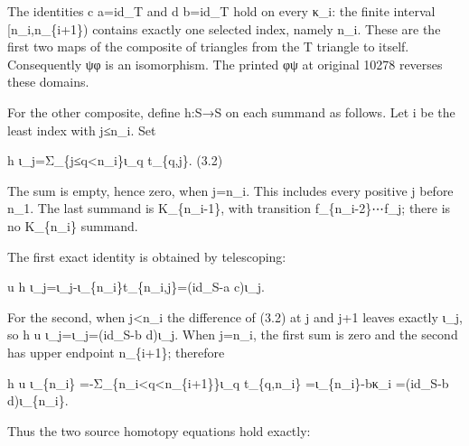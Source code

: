 \documentclass[11pt]{article}
\begin{document}
The identities c a\allowbreak{}=id\_\allowbreak{}T and d b\allowbreak{}=id\_\allowbreak{}T hold on every κ\_\allowbreak{}i:\allowbreak{} the finite interval [n\_\allowbreak{}i,\allowbreak{}n\_\allowbreak{}\{i\allowbreak{}+1\})\allowbreak{} contains exactly one selected index,\allowbreak{} namely n\_\allowbreak{}i. These are the first two maps of the composite of triangles from the T triangle to itself. Consequently ψφ is an isomorphism. The printed φψ at original 10278 reverses these domains.

For the other composite,\allowbreak{} define h:\allowbreak{}S\allowbreak{}→S on each summand as follows. Let i be the least index with j≤n\_\allowbreak{}i. Set

h ι\_\allowbreak{}j\allowbreak{}=Σ\_\allowbreak{}\{j≤q<n\_\allowbreak{}i\}ι\_\allowbreak{}q t\_\allowbreak{}\{q,\allowbreak{}j\}. (3.2)\allowbreak{}

The sum is empty,\allowbreak{} hence zero,\allowbreak{} when j\allowbreak{}=n\_\allowbreak{}i. This includes every positive j before n\_\allowbreak{}1. The last summand is K\_\allowbreak{}\{n\_\allowbreak{}i-1\},\allowbreak{} with transition f\_\allowbreak{}\{n\_\allowbreak{}i-2\}⋯f\_\allowbreak{}j; there is no K\_\allowbreak{}\{n\_\allowbreak{}i\} summand.

The first exact identity is obtained by telescoping:\allowbreak{}

u h ι\_\allowbreak{}j\allowbreak{}=ι\_\allowbreak{}j-ι\_\allowbreak{}\{n\_\allowbreak{}i\}t\_\allowbreak{}\{n\_\allowbreak{}i,\allowbreak{}j\}\allowbreak{}=(id\_\allowbreak{}S-a c)\allowbreak{}ι\_\allowbreak{}j.

For the second,\allowbreak{} when j<n\_\allowbreak{}i the difference of (3.2)\allowbreak{} at j and j\allowbreak{}+1 leaves exactly ι\_\allowbreak{}j,\allowbreak{} so h u ι\_\allowbreak{}j\allowbreak{}=ι\_\allowbreak{}j\allowbreak{}=(id\_\allowbreak{}S-b d)\allowbreak{}ι\_\allowbreak{}j. When j\allowbreak{}=n\_\allowbreak{}i,\allowbreak{} the first sum is zero and the second has upper endpoint n\_\allowbreak{}\{i\allowbreak{}+1\}; therefore

h u ι\_\allowbreak{}\{n\_\allowbreak{}i\} \allowbreak{}=-Σ\_\allowbreak{}\{n\_\allowbreak{}i<q<n\_\allowbreak{}\{i\allowbreak{}+1\}\}ι\_\allowbreak{}q t\_\allowbreak{}\{q,\allowbreak{}n\_\allowbreak{}i\} \allowbreak{}=ι\_\allowbreak{}\{n\_\allowbreak{}i\}-bκ\_\allowbreak{}i \allowbreak{}=(id\_\allowbreak{}S-b d)\allowbreak{}ι\_\allowbreak{}\{n\_\allowbreak{}i\}.

Thus the two source homotopy equations hold exactly:\allowbreak{}
\end{document}
